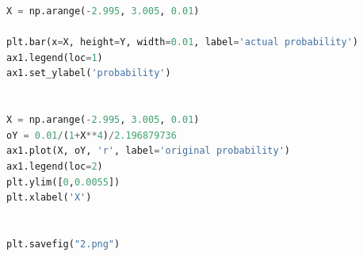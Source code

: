 \documentclass[a4paper,11pt]{article}
\begin{document}
\begin{appendices}
\begin{lstlisting}[language = python]
X = np.arange(-2.995, 3.005, 0.01)

plt.bar(x=X, height=Y, width=0.01, label='actual probability')
ax1.legend(loc=1)
ax1.set_ylabel('probability')


X = np.arange(-2.995, 3.005, 0.01)
oY = 0.01/(1+X**4)/2.196879736
ax1.plot(X, oY, 'r', label='original probability')
ax1.legend(loc=2)
plt.ylim([0,0.0055])
plt.xlabel('X')


plt.savefig("2.png")

\end{lstlisting}


\end{appendices}
\end{document}
